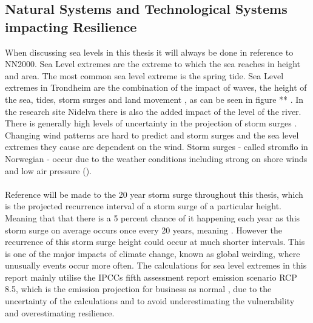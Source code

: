 \subsection{Natural Systems and Technological Systems impacting Resilience }
When discussing sea levels in this thesis it will always be done in reference to NN2000. Sea Level extremes are the extreme to which the sea reaches in height and area. The most common sea level extreme is the spring tide. Sea Level extremes in Trondheim are the combination of the impact of waves, the height of the sea, tides, storm surges and land movement \cite{hanssen-bauer_climate_2017}, as can be seen in figure ** . In the research site Nidelva there is also the added impact of the level of the river. There is generally high levels of uncertainty in the projection of storm surges \cite{nilsen_sealevelchangefornorway_nodate}. Changing wind patterns are hard to predict \cite{rod_three_2015} and storm surges and the sea level extremes they cause are dependent on the wind. Storm surges - called stromflo in Norwegian -  occur due to the weather conditions including strong on shore winds and low air pressure (\cite{hanssen_saksframlegg_2013}). 

\paragraph{}

Reference will be made to the 20 year storm surge throughout this thesis, which is the projected recurrence interval of a storm surge of a particular height.  Meaning that that there is a 5 percent chance of it happening each year as this storm surge on average occurs once every 20 years, meaning \cite{hanssen_saksframlegg_2013}. However the recurrence of this storm surge height could occur at much shorter intervals.  This is one of the major impacts of climate change, known as global weirding, where unusually events occur more often. The calculations for sea level extremes in this report mainly utilise the IPCCs fifth assessment report emission scenario RCP 8.5, which is the emission projection for business as normal \cite{hanssen-bauer_climate_2017}, due to the uncertainty of the calculations and to avoid underestimating the vulnerability and overestimating resilience.  



